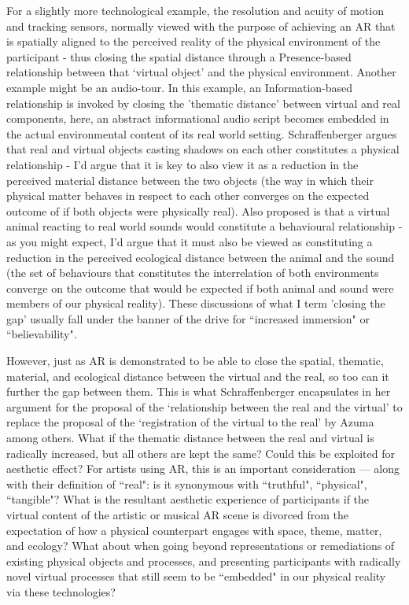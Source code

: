 For a slightly more technological example, the resolution and acuity of motion and tracking sensors, normally viewed with the purpose of achieving an AR that is spatially aligned to the perceived reality of the physical environment of the participant - thus closing the spatial distance through a Presence-based relationship between that `virtual object' and the physical environment. Another example might be an audio-tour. In this example, an Information-based relationship is invoked by closing the 'thematic distance' between virtual and real components, here, an abstract informational audio script becomes embedded in the actual environmental content of its real world setting. Schraffenberger argues that real and virtual objects casting shadows on each other constitutes a physical relationship - I'd argue that it is key to also view it as a reduction in the perceived material distance between the two objects (the way in which their physical matter behaves in respect to each other converges on the expected outcome of if both objects were physically real). Also proposed is that a virtual animal reacting to real world sounds would constitute a behavioural relationship - as you might expect, I'd argue that it must also be viewed as constituting a reduction in the perceived ecological distance between the animal and the sound (the set of behaviours that constitutes the interrelation of both environments converge on the outcome that would be expected if both animal and sound were members of our physical reality). These discussions of what I term 'closing the gap' usually fall under the banner of the drive for ``increased immersion" or ``believability". 

However, just as AR is demonstrated to be able to close the spatial, thematic, material, and ecological distance between the virtual and the real, so too can it further the gap between them. This is what Schraffenberger encapsulates in her argument for the proposal of the `relationship between the real and the virtual' to replace the proposal of the `registration of the virtual to the real' by Azuma among others. What if the thematic distance between the real and virtual is radically increased, but all others are kept the same? Could this be exploited for aesthetic effect? For artists using AR, this is an important consideration — along with their definition of ``real": is it synonymous with ``truthful", ``physical", ``tangible"? What is the resultant aesthetic experience of participants if the virtual content of the artistic or musical AR scene is divorced from the expectation of how a physical counterpart engages with space, theme, matter, and ecology? What about when going beyond representations or remediations of existing physical objects and processes, and presenting participants with radically novel virtual processes that still seem to be ``embedded" in our physical reality via these technologies?

